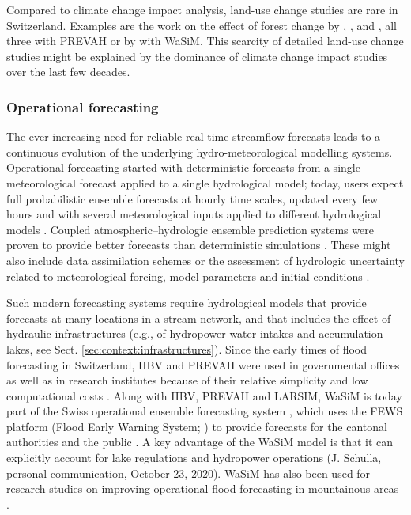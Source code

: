 \documentclass[10pt,a4paper]{article}
\begin{document}
Compared to climate change impact analysis, land-use change studies are rare in Switzerland. Examples are the work on the effect of forest change by \citet{Koplin2013}, \citet{Schattan2013}, and \citet{Speich2020}, all three with PREVAH or by \citet{Alaoui2014} with WaSiM. This scarcity of detailed land-use change studies might be explained by the dominance of climate change impact studies over the last few decades. 


\subsubsection{Operational forecasting}
\label{sec:context:forecasting}

The ever increasing need for reliable real-time streamflow forecasts leads to a continuous evolution of the underlying hydro-meteorological modelling systems. Operational forecasting started with deterministic forecasts from a single meteorological forecast applied to a single hydrological model; today, users expect full probabilistic ensemble forecasts at hourly time scales, updated every few hours and with several meteorological inputs applied to different hydrological models \citep{Jasper2016}. Coupled atmospheric--hydrologic ensemble prediction systems were proven to provide better forecasts than deterministic simulations \citep{Verbunt2007, Zappa2008, Jaun2008, Liechti2013}. These might also include data assimilation schemes \citep{JorgHess2015a} or the assessment of hydrologic uncertainty related to meteorological forcing, model parameters and initial conditions \citep{Jaun2009, Zappa2011a, Fundel2011}.

Such modern forecasting systems require hydrological models that provide forecasts at many locations in a stream network, and that includes the effect of hydraulic infrastructures (e.g., of hydropower water intakes and accumulation lakes, see Sect. \ref{sec:context:infrastructures}). Since the early times of flood forecasting in Switzerland, HBV and PREVAH were used in governmental offices \citep{Jasper2016} as well as in research institutes because of their relative simplicity and low computational costs \citep{Verbunt2006, Addor2011, Murphy2019, Antonetti2019}. Along with HBV, PREVAH and LARSIM, WaSiM is today part of the Swiss operational ensemble forecasting system \citep{Jasper2016}, which uses the FEWS platform (Flood Early Warning System; \citealp{Werner2013}) to provide forecasts for the cantonal authorities and the public \citep{FOEN2019}. A key advantage of the WaSiM model is that it can explicitly account for lake regulations and hydropower operations (J. Schulla, personal communication, October 23, 2020). WaSiM has also been used for research studies on improving operational flood forecasting in mountainous areas \citep{Jasper2002, Jasper2003, Ahrens2003a, Ahrens2003b}.
\end{document}

